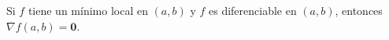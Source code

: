 \item Si $f$ tiene un mínimo local en $(a, b)$ y $f$ es diferenciable en $(a, b)$, entonces $\nabla f(a, b) = \mathbf{0}$.
